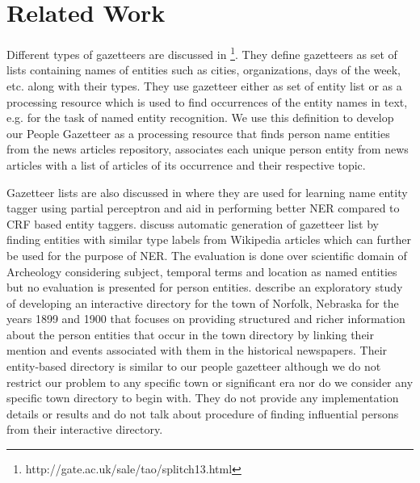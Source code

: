 \documentclass[10pt,journal,compsoc]{IEEEtran}
\begin{document}

\section{Related Work}
\label{influential:rw}

Different types of gazetteers are discussed in \footnote{http://gate.ac.uk/sale/tao/splitch13.html}. They define gazetteers as set of lists containing names of entities such as cities, organizations, days of the week, etc. along with their types. They use gazetteer either as set of entity list or as a processing resource which is used to find occurrences of the entity names in text, e.g. for the task of named entity recognition. We use this definition to develop our People Gazetteer as a processing resource that finds person name entities from the news articles repository, associates each unique person entity from news articles with a list of articles of its occurrence and their respective topic.

Gazetteer lists are also discussed in \cite{carlson2009learning} where they are used for learning name entity tagger using partial perceptron and aid in performing better NER compared to CRF based entity taggers.
\cite{zhang2009novel} discuss automatic generation of gazetteer list by finding entities with similar type labels from Wikipedia articles which can further be used for the purpose of NER. The evaluation is done over scientific domain of Archeology considering subject, temporal terms and location as named entities but no evaluation is presented for person entities. \cite{allen2013toward} describe an exploratory study of developing an interactive directory for the town of Norfolk, Nebraska for the years 1899 and 1900 that focuses on providing structured and richer information about the person entities that occur in the town directory by linking their mention and events associated with them in the historical newspapers. Their entity-based directory is similar to our people gazetteer although we do not restrict our problem to any specific town or significant era nor do we consider any specific town directory to begin with. They do not provide any implementation details or results and do not talk about procedure of finding influential persons from their interactive directory. 
\end{document}
